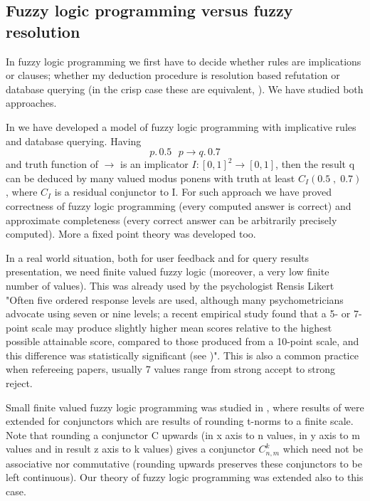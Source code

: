 \subsection{Fuzzy logic programming versus fuzzy resolution}
     In fuzzy logic programming we first have to decide whether rules are implications or clauses; whether my deduction procedure is resolution based refutation or database querying (in the crisp case these are equivalent, \cite{Ll}). We have studied both approaches. 
     
     In \cite{3} we have developed a model of fuzzy logic programming with implicative rules and database querying. Having 
\begin{displaymath}
p.\,0.5\ \ \ p\rightarrow q.\,0.7	
\end{displaymath}
and truth function of $\rightarrow$ is an implicator $I:[0,1]^2 \rightarrow [0,1]$, then the result q can be deduced by many valued modus ponens with truth at least $C_I(0.5\;,\;0.7)$, where $C_I$ is a residual conjunctor to I. For such approach we have proved correctness of fuzzy logic programming (every computed answer is correct) and approximate completeness (every correct answer can be arbitrarily precisely computed). More a fixed point theory was developed too. 
     
     In a real world situation, both for user feedback and for query results presentation, we need finite valued fuzzy logic (moreover, a very low finite number of values). This was already used by the psychologist Rensis Likert "Often five ordered response levels are used, although many psychometricians advocate using seven or nine levels; a recent empirical study found that a 5- or 7- point scale may produce slightly higher mean scores relative to the highest possible attainable score, compared to those produced from a 10-point scale, and this difference was statistically significant (see \cite{Li})". This is also a common practice when refereeing papers, usually 7 values range from strong accept to strong reject. 
     
          Small finite valued fuzzy logic programming was studied in \cite{16}, where results of \cite{3} were extended for conjunctors which are results of rounding t-norms to a finite scale. Note that rounding a conjunctor C upwards (in x axis to n values, in y axis to m values and in result z axis to k values) gives a conjunctor $C_{n,m}^{k}$ which need not be associative nor commutative (rounding upwards preserves these conjunctors to be left continuous). Our theory of fuzzy logic programming was extended also to this case. 
     
